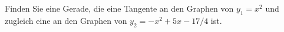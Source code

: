 \item Finden Sie eine Gerade, die eine Tangente an den Graphen von $y_1=x^2$ und zugleich eine an den Graphen von $y_2=-x^2+5x-17/4$ ist.
